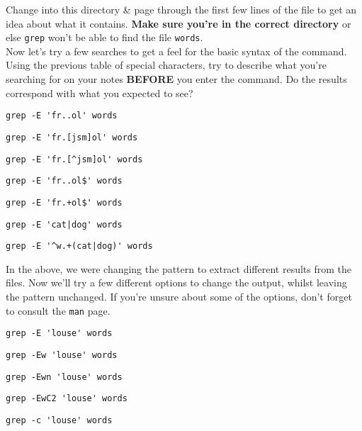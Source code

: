 \begin{steps}
Change into this directory \& page through the first few lines of the file to get an idea about what it contains. 
\textbf{Make sure you're in the correct directory} or else \texttt{grep} won't be able to find the file \texttt{words}. \\

Now let's try a few searches to get a feel for the basic syntax of the command.
Using the previous table of special characters, try to describe what you're searching for on your notes \textbf{BEFORE} you enter the command.
Do the results correspond with what you expected to see?

\begin{lstlisting}
grep -E 'fr..ol' words
\end{lstlisting}
\begin{lstlisting}
grep -E 'fr.[jsm]ol' words
\end{lstlisting}
\begin{lstlisting}
grep -E 'fr.[^jsm]ol' words
\end{lstlisting}
\begin{lstlisting}
grep -E 'fr..ol$' words
\end{lstlisting}
\begin{lstlisting}
grep -E 'fr.+ol$' words
\end{lstlisting}
\begin{lstlisting}
grep -E 'cat|dog' words
\end{lstlisting}
\begin{lstlisting}
grep -E '^w.+(cat|dog)' words
\end{lstlisting}
\end{steps}

\begin{steps}
In the above, we were changing the pattern to extract different results from the files.
Now we'll try a few different options to change the output, whilst leaving the pattern unchanged.
If you're unsure about some of the options, don't forget to consult the \texttt{man} page. \\
\begin{lstlisting}
grep -E 'louse' words
\end{lstlisting}
\begin{lstlisting}
grep -Ew 'louse' words
\end{lstlisting}
\begin{lstlisting}
grep -Ewn 'louse' words
\end{lstlisting}
\begin{lstlisting}
grep -EwC2 'louse' words
\end{lstlisting}
\begin{lstlisting}
grep -c 'louse' words
\end{lstlisting}
\end{steps}

